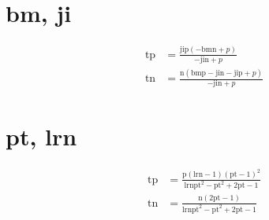 \documentclass[3p,times]{elsarticle}
\begin{document}
\begin{footnotesize}
\begin{landscape}
\section{bm, ji}
\begin{align}
\mathrm{tp} &= \frac{\mathrm{ji} \mathrm{p} \left(- \mathrm{bm} \mathrm{n} + p\right)}{- \mathrm{ji} \mathrm{n} + p}\\
\mathrm{tn} &= \frac{\mathrm{n} \left(\mathrm{bm} \mathrm{p} - \mathrm{ji} \mathrm{n} - \mathrm{ji} \mathrm{p} + p\right)}{- \mathrm{ji} \mathrm{n} + p}
\end{align}
\section{pt, lrn}
\begin{align}
\mathrm{tp} &= \frac{\mathrm{p} \left(\mathrm{lrn} - 1\right) \left(\mathrm{pt} - 1\right)^{2}}{\mathrm{lrn} \mathrm{pt}^{2} - \mathrm{pt}^{2} + 2 \mathrm{pt} - 1}\\
\mathrm{tn} &= \frac{\mathrm{n} \left(2 \mathrm{pt} - 1\right)}{\mathrm{lrn} \mathrm{pt}^{2} - \mathrm{pt}^{2} + 2 \mathrm{pt} - 1}
\end{align}

\end{landscape}
\end{footnotesize}
\end{document}
